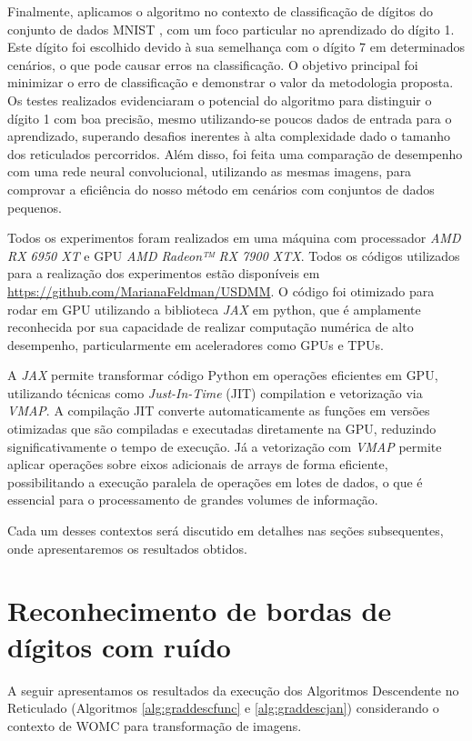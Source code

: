Finalmente, aplicamos o algoritmo no contexto de classificação de dígitos do conjunto de dados MNIST \cite{MNIST:dataset}, com um foco particular no aprendizado do dígito 1. Este dígito foi escolhido devido à sua semelhança com o dígito 7 em determinados cenários, o que pode causar erros na classificação. O objetivo principal foi minimizar o erro de classificação e demonstrar o valor da metodologia proposta. Os testes realizados evidenciaram o potencial do algoritmo para distinguir o dígito 1 com boa precisão, mesmo utilizando-se poucos dados de entrada para o aprendizado, superando desafios inerentes à alta complexidade dado o tamanho dos reticulados percorridos. Além disso, foi feita uma comparação de desempenho com uma rede neural convolucional, utilizando as mesmas imagens, para comprovar a eficiência do nosso método em cenários com conjuntos de dados pequenos.

Todos os experimentos foram realizados em uma máquina com processador \textit{AMD RX 6950 XT} e GPU \textit{AMD Radeon™ RX 7900 XTX}. Todos os códigos utilizados para a realização dos experimentos estão disponíveis em \url{https://github.com/MarianaFeldman/USDMM}. O código foi otimizado para rodar em GPU utilizando a biblioteca \textit{JAX} \cite{JAX} em python, que é amplamente reconhecida por sua capacidade de realizar computação numérica de alto desempenho, particularmente em aceleradores como GPUs e TPUs. 

A \textit{JAX} permite transformar código Python em operações eficientes em GPU, utilizando técnicas como \textit{Just-In-Time} (JIT) compilation e vetorização via \textit{VMAP}. A compilação JIT converte automaticamente as funções em versões otimizadas que são compiladas e executadas diretamente na GPU, reduzindo significativamente o tempo de execução. Já a vetorização com \textit{VMAP} permite aplicar operações sobre eixos adicionais de arrays de forma eficiente, possibilitando a execução paralela de operações em lotes de dados, o que é essencial para o processamento de grandes volumes de informação. 

Cada um desses contextos será discutido em detalhes nas seções subsequentes, onde apresentaremos os resultados obtidos.

\section{Reconhecimento de bordas de dígitos com ruído}
\label{sec:app_digitos}

A seguir apresentamos os resultados da execução dos Algoritmos Descendente no Reticulado (Algoritmos \ref{alg:graddescfunc} e \ref{alg:graddescjan}) considerando o contexto de WOMC para transformação de imagens.

